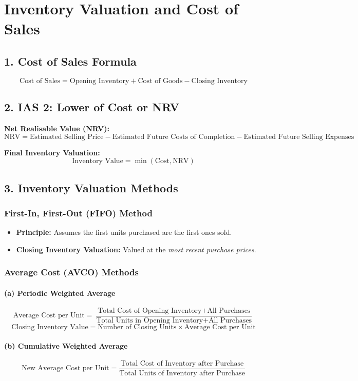 
\section*{Inventory Valuation and Cost of Sales}

\subsection*{1. Cost of Sales Formula}
\[
\text{Cost of Sales} = \text{Opening Inventory} + \text{Cost of Goods} - \text{Closing Inventory}
\]

\subsection*{2. IAS 2: Lower of Cost or NRV}

\textbf{Net Realisable Value (NRV):}
\[
\text{NRV} = \text{Estimated Selling Price} - \text{Estimated Future Costs of Completion} - \text{Estimated Future Selling Expenses}
\]

\textbf{Final Inventory Valuation:}
\[
\text{Inventory Value} = \min(\text{Cost}, \text{NRV})
\]

\subsection*{3. Inventory Valuation Methods}

\subsubsection*{First-In, First-Out (FIFO) Method}
\begin{itemize}
    \item \textbf{Principle:} Assumes the first units purchased are the first ones sold.
    \item \textbf{Closing Inventory Valuation:} Valued at the \emph{most recent purchase prices}.
\end{itemize}

\subsubsection*{Average Cost (AVCO) Methods}

\paragraph{(a) Periodic Weighted Average}
\[
\text{Average Cost per Unit} = \frac{\text{Total Cost of Opening Inventory} + \text{All Purchases}}{\text{Total Units in Opening Inventory} + \text{All Purchases}}
\]
\[
\text{Closing Inventory Value} = \text{Number of Closing Units} \times \text{Average Cost per Unit}
\]

\paragraph{(b) Cumulative Weighted Average}
\[
\text{New Average Cost per Unit} = \frac{\text{Total Cost of Inventory after Purchase}}{\text{Total Units of Inventory after Purchase}}
\]


